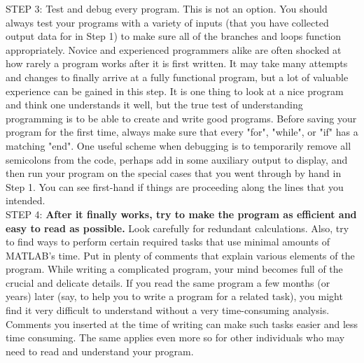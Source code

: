 \documentclass[../main.tex]{subfiles}
\begin{document}
STEP 3: Test and debug every program. This is not an option. You should always test your programs with a variety of inputs (that you have collected output data for in Step 1) to make sure all of the branches and loops function appropriately. Novice and experienced programmers alike are often shocked at how rarely a program works after it is first written. It may take many attempts and changes to finally arrive at a fully functional program, but a lot of valuable experience can be gained in this step. It is one thing to look at a nice program and think one understands it well, but the true test of understanding programming is to be able to create and write good programs. Before saving your program for the first time, always make sure that every "for", "while", or "if" has a matching "end". One useful scheme when debugging is to temporarily remove all semicolons from the code, perhaps add in some auxiliary output to display, and then run your program on the special cases that you went through by hand in Step 1. You can see first-hand if things are proceeding along the lines that you intended.\\

STEP 4: \textbf {After it finally works, try to make the program as efficient and easy to read as possible.} Look carefully for redundant calculations. Also, try to find ways to perform certain required tasks that use minimal amounts of MATLAB's time. Put in plenty of comments that explain various elements of the program. While writing a complicated program, your mind becomes full of the crucial and delicate details. If you read the same program a few months (or years) later (say, to help you to write a program for a related task), you might find it very difficult to understand without a very time-consuming analysis. Comments you inserted at the time of writing can make such tasks easier and less time consuming. The same applies even more so for other individuals who may need to read and understand your program.\\
\end{document}
